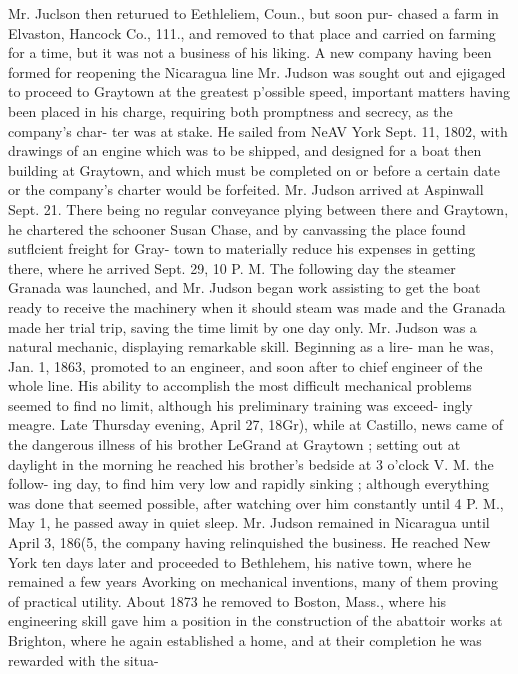 \documentclass{book}
\begin{document}
Mr. Juclson then returued to Eethleliem, Coun., but soon pur- 
chased a farm in Elvaston, Hancock Co., 111., and removed to 
that place and carried on farming for a time, but it was not a 
business of his liking. A new company having been formed 
for reopening the Nicaragua line Mr. Judson was sought out 
and ejigaged to proceed to Graytown at the greatest p'ossible 
speed, important matters having been placed in his charge, 
requiring both promptness and secrecy, as the company's char- 
ter was at stake. He sailed from NeAV York Sept. 11, 1802, 
with drawings of an engine which was to be shipped, and 
designed for a boat then building at Graytown, and which must 
be completed on or before a certain date or the company's 
charter would be forfeited. Mr. Judson arrived at Aspinwall 
Sept. 21. There being no regular conveyance plying between 
there and Graytown, he chartered the schooner Susan Chase, 
and by canvassing the place found sutflcient freight for Gray- 
town to materially reduce his expenses in getting there, where 
he arrived Sept. 29, 10 P. M. The following day the steamer 
Granada was launched, and Mr. Judson began work assisting 
to get the boat ready to receive the machinery when it should 
steam was made and the Granada made her trial trip, saving 
the time limit by one day only. Mr. Judson was a natural 
mechanic, displaying remarkable skill. Beginning as a lire- 
man he was, Jan. 1, 1863, promoted to an engineer, and soon 
after to chief engineer of the whole line. His ability to 
accomplish the most difficult mechanical problems seemed to 
find no limit, although his preliminary training was exceed- 
ingly meagre. Late Thursday evening, April 27, 18Gr), while 
at Castillo, news came of the dangerous illness of his brother 
LeGrand at Graytown ; setting out at daylight in the morning 
he reached his brother's bedside at 3 o'clock V. M. the follow- 
ing day, to find him very low and rapidly sinking ; although 
everything was done that seemed possible, after watching over 
him constantly until 4 P. M., May 1, he passed away in quiet 
sleep. Mr. Judson remained in Nicaragua until April 3, 186(5, 
the company having relinquished the business. He reached 
New York ten days later and proceeded to Bethlehem, his 
native town, where he remained a few years Avorking on 
mechanical inventions, many of them proving of practical 
utility. About 1873 he removed to Boston, Mass., where his 
engineering skill gave him a position in the construction of 
the abattoir works at Brighton, where he again established a 
home, and at their completion he was rewarded with the situa- 
\end{document}
